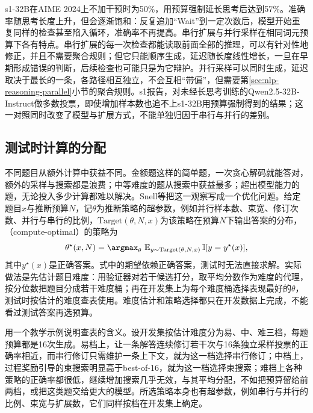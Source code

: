 s1-32B在AIME 2024上不加干预时为50\%，用预算强制延长思考后达到57\%。准确率随思考长度上升，但会逐渐饱和：反复追加“Wait”到一定次数后，模型开始重复同样的检查甚至陷入循环，准确率不再提高。串行扩展与并行采样在相同词元预算下各有特点。串行扩展的每一次检查都能读取前面全部的推理，可以有针对性地修正，并且不需要聚合规则；但它只能顺序生成，延迟随长度线性增长，一旦在早期形成错误的判断，后续检查也可能只是为它辩护。并行采样可以同时生成，延迟取决于最长的一条，各路径相互独立，不会互相“带偏”，但需要第\ref{sec:nlp-reasoning-parallel}小节的聚合规则。s1报告，对未经长思考训练的Qwen2.5-32B-Instruct做多数投票，即使增加样本数也追不上s1-32B用预算强制得到的结果；这一对照同时改变了模型与扩展方式，不能单独归因于串行与并行的差别。

\subsection{测试时计算的分配}
\label{sec:nlp-reasoning-compute-allocation}

不同题目从额外计算中获益不同。金额题这样的简单题，一次贪心解码就能答对，额外的采样与搜索都是浪费；中等难度的题从搜索中获益最多；超出模型能力的题，无论投入多少计算都难以解决。Snell等把这一观察写成一个优化问题。给定题目$x$与推断预算$N$，记$\theta$为推断策略的超参数，例如并行样本数、束宽、修订次数、并行与串行的比例，$\mathrm{Target}(\theta,N,x)$为该策略在预算$N$下输出答案的分布，（compute-optimal）的策略为
\begin{equation}
  \theta^\star(x,N)=\argmax_{\theta}\ \mathbb E_{y\sim\mathrm{Target}(\theta,N,x)}\,\mathbb I[y=y^\star(x)],
  \label{eq:nlp-reasoning-compute-optimal}
\end{equation}
其中$y^\star(x)$是正确答案。式中的期望依赖正确答案，测试时无法直接求解。实际做法是先估计题目难度：用验证器对若干候选打分，取平均分数作为难度的代理，按分位数把题目分成若干难度桶；再在开发集上为每个难度桶选择表现最好的$\theta$，测试时按估计的难度查表使用。难度估计和策略选择都只在开发数据上完成，不能看过测试答案再选预算。

用一个教学示例说明查表的含义。设开发集按估计难度分为易、中、难三档，每题预算都是16次生成。易档上，让一条解答连续修订若干次与16条独立采样投票的正确率相近，而串行修订只需维护一条上下文，就为这一档选择串行修订；中档上，过程奖励引导的束搜索明显高于best-of-16，就为这一档选择束搜索；难档上各种策略的正确率都很低，继续增加搜索几乎无效，与其平均分配，不如把预算留给前两档，或把这类题交给更大的模型。所选策略本身也有超参数，例如串行与并行的比例、束宽与扩展数，它们同样按档在开发集上确定。

